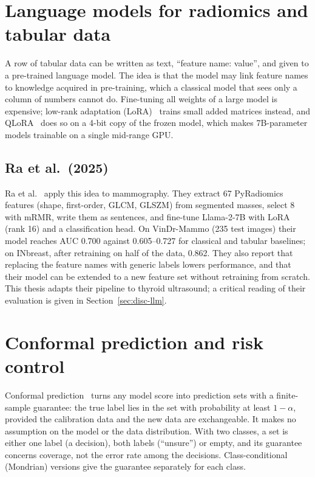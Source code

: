 \section{Language models for radiomics and tabular data}
\label{sec:bg-llm}

A row of tabular data can be written as text, ``feature name: value'', and given to a pre-trained
language model. The idea is that the model may link feature names to knowledge acquired in
pre-training, which a classical model that sees only a column of numbers cannot do. Fine-tuning
all weights of a large model is expensive; low-rank adaptation (LoRA)~\citep{hu2022lora} trains
small added matrices instead, and QLoRA~\citep{dettmers2023qlora} does so on a 4-bit copy of the
frozen model, which makes 7B-parameter models trainable on a single mid-range GPU.

\subsection{Ra et al.\ (2025)}

Ra et al.~\citep{ra2025} apply this idea to mammography. They extract 67 PyRadiomics features
(shape, first-order, GLCM, GLSZM) from segmented masses, select 8 with mRMR, write them as
sentences, and fine-tune Llama-2-7B with LoRA (rank 16) and a classification head. On VinDr-Mammo
(235 test images) their model reaches AUC 0.700 against 0.605--0.727 for classical and tabular
baselines; on INbreast, after retraining on half of the data, 0.862. They also report that
replacing the feature names with generic labels lowers performance, and that their model can be
extended to a new feature set without retraining from scratch. This thesis adapts their pipeline
to thyroid ultrasound; a critical reading of their evaluation is given in
Section~\ref{sec:disc-llm}.

\section{Conformal prediction and risk control}
\label{sec:bg-conformal}

Conformal prediction~\citep{vovk2005} turns any model score into prediction sets with a
finite-sample guarantee: the true label lies in the set with probability at least $1 - \alpha$,
provided the calibration data and the new data are exchangeable. It makes no assumption on the
model or the data distribution. With two classes, a set is either one label (a decision), both
labels (``unsure'') or empty, and its guarantee concerns coverage, not the error rate among the
decisions. Class-conditional (Mondrian) versions give the guarantee separately for each class.

